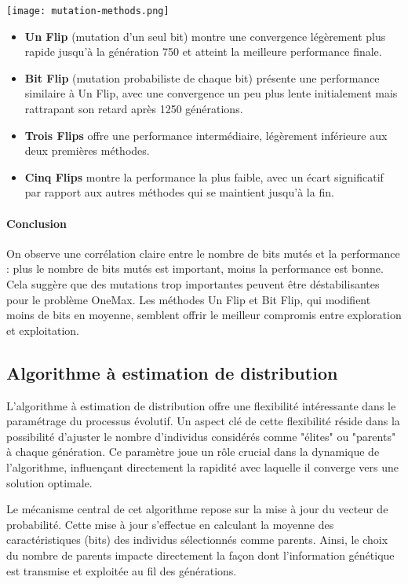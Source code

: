 \documentclass{article}
\begin{document}
\texttt{[image: mutation-methods.png]}

\begin{itemize}
    \item \textbf{Un Flip} (mutation d'un seul bit) montre une convergence légèrement plus rapide jusqu'à la génération 750 et atteint la meilleure performance finale.

    \item \textbf{Bit Flip} (mutation probabiliste de chaque bit) présente une performance similaire à Un Flip, avec une convergence un peu plus lente initialement mais rattrapant son retard après 1250 générations.

    \item \textbf{Trois Flips} offre une performance intermédiaire, légèrement inférieure aux deux premières méthodes.

    \item \textbf{Cinq Flips} montre la performance la plus faible, avec un écart significatif par rapport aux autres méthodes qui se maintient jusqu'à la fin.
\end{itemize}

\paragraph{Conclusion} On observe une corrélation claire entre le nombre de bits mutés et la performance : plus le nombre de bits mutés est important, moins la performance est bonne. Cela suggère que des mutations trop importantes peuvent être déstabilisantes pour le problème OneMax. Les méthodes Un Flip et Bit Flip, qui modifient moins de bits en moyenne, semblent offrir le meilleur compromis entre exploration et exploitation.

\subsection{Algorithme à estimation de distribution}
L'algorithme à estimation de distribution offre une flexibilité intéressante dans le paramétrage du processus évolutif. Un aspect clé de cette flexibilité réside dans la possibilité d'ajuster le nombre d'individus considérés comme "élites" ou "parents" à chaque génération. Ce paramètre joue un rôle crucial dans la dynamique de l'algorithme, influençant directement la rapidité avec laquelle il converge vers une solution optimale.

Le mécanisme central de cet algorithme repose sur la mise à jour du vecteur de probabilité. Cette mise à jour s'effectue en calculant la moyenne des caractéristiques (bits) des individus sélectionnés comme parents. Ainsi, le choix du nombre de parents impacte directement la façon dont l'information génétique est transmise et exploitée au fil des générations.
\end{document}
